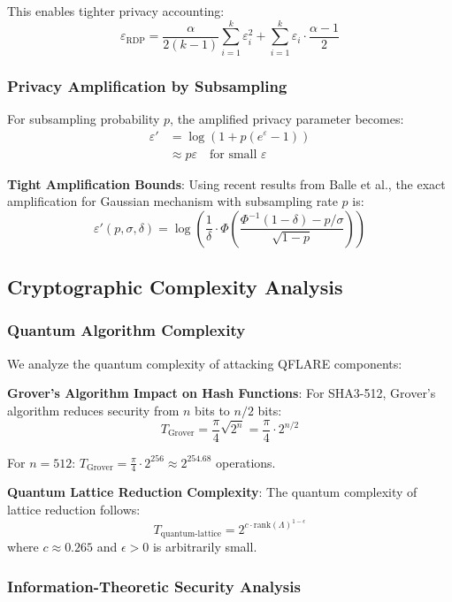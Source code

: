 \documentclass[journal,onecolumn,draftclsnofoot]{IEEEtran}
\begin{document}
This enables tighter privacy accounting:
$$\varepsilon_{\text{RDP}} = \frac{\alpha}{2(k-1)} \sum_{i=1}^k \varepsilon_i^2 + \sum_{i=1}^k \varepsilon_i \cdot \frac{\alpha-1}{2}$$

\subsubsection{Privacy Amplification by Subsampling}

For subsampling probability $p$, the amplified privacy parameter becomes:
\begin{align}
\varepsilon' &= \log\left(1 + p(e^\varepsilon - 1)\right) \\
&\approx p\varepsilon \quad \text{for small } \varepsilon
\end{align}

\textbf{Tight Amplification Bounds}: Using recent results from Balle et al., the exact amplification for Gaussian mechanism with subsampling rate $p$ is:
$$\varepsilon'(p, \sigma, \delta) = \log\left(\frac{1}{\delta} \cdot \Phi\left(\frac{\Phi^{-1}(1-\delta) - p/\sigma}{\sqrt{1-p}}\right)\right)$$

\subsection{Cryptographic Complexity Analysis}

\subsubsection{Quantum Algorithm Complexity}

We analyze the quantum complexity of attacking QFLARE components:

\textbf{Grover's Algorithm Impact on Hash Functions}:
For SHA3-512, Grover's algorithm reduces security from $n$ bits to $n/2$ bits:
$$T_{\text{Grover}} = \frac{\pi}{4}\sqrt{2^n} = \frac{\pi}{4} \cdot 2^{n/2}$$

For $n = 512$: $T_{\text{Grover}} = \frac{\pi}{4} \cdot 2^{256} \approx 2^{254.68}$ operations.

\textbf{Quantum Lattice Reduction Complexity}:
The quantum complexity of lattice reduction follows:
$$T_{\text{quantum-lattice}} = 2^{c \cdot \text{rank}(\Lambda)^{1-\epsilon}}$$
where $c \approx 0.265$ and $\epsilon > 0$ is arbitrarily small.

\subsubsection{Information-Theoretic Security Analysis}
\end{document}
